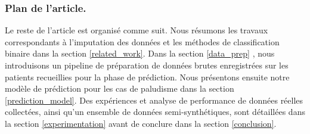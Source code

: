 \subsubsection{Plan de l’article.}
Le reste de l’article est organisé comme suit. Nous résumons les travaux correspondants à l’imputation des données et les méthodes de classification binaire dans la section \ref{related_work}. Dans la section \ref{data_prep} , nous introduisons un pipeline de préparation de données brutes enregistrées sur les patients recueillies pour la phase de prédiction. Nous présentons ensuite notre modèle de prédiction pour les cas de paludisme dans la section \ref{prediction_model}. Des expériences et analyse de performance de données réelles collectées, ainsi qu’un ensemble de données semi-synthétiques, sont détaillées dans la section \ref{experimentation} avant de conclure dans la section \ref{conclusion}.
 
